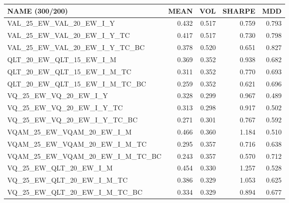 \begin{tabular}{lrrrr}
\toprule
NAME (300/200) & MEAN & VOL & SHARPE & MDD \\
\midrule
VAL\_25\_EW\_VAL\_20\_EW\_I\_Y & 0.432 & 0.517 & 0.759 & 0.793 \\
VAL\_25\_EW\_VAL\_20\_EW\_I\_Y\_TC & 0.417 & 0.517 & 0.730 & 0.798 \\
VAL\_25\_EW\_VAL\_20\_EW\_I\_Y\_TC\_BC & 0.378 & 0.520 & 0.651 & 0.827 \\
QLT\_20\_EW\_QLT\_15\_EW\_I\_M & 0.369 & 0.352 & 0.938 & 0.682 \\
QLT\_20\_EW\_QLT\_15\_EW\_I\_M\_TC & 0.311 & 0.352 & 0.770 & 0.693 \\
QLT\_20\_EW\_QLT\_15\_EW\_I\_M\_TC\_BC & 0.259 & 0.352 & 0.621 & 0.696 \\
VQ\_25\_EW\_VQ\_20\_EW\_I\_Y & 0.328 & 0.299 & 0.967 & 0.489 \\
VQ\_25\_EW\_VQ\_20\_EW\_I\_Y\_TC & 0.313 & 0.298 & 0.917 & 0.502 \\
VQ\_25\_EW\_VQ\_20\_EW\_I\_Y\_TC\_BC & 0.271 & 0.301 & 0.767 & 0.592 \\
VQAM\_25\_EW\_VQAM\_20\_EW\_I\_M & 0.466 & 0.360 & 1.184 & 0.510 \\
VQAM\_25\_EW\_VQAM\_20\_EW\_I\_M\_TC & 0.295 & 0.357 & 0.716 & 0.638 \\
VQAM\_25\_EW\_VQAM\_20\_EW\_I\_M\_TC\_BC & 0.243 & 0.357 & 0.570 & 0.712 \\
VQ\_25\_EW\_QLT\_20\_EW\_I\_M & 0.454 & 0.330 & 1.257 & 0.528 \\
VQ\_25\_EW\_QLT\_20\_EW\_I\_M\_TC & 0.386 & 0.329 & 1.053 & 0.625 \\
VQ\_25\_EW\_QLT\_20\_EW\_I\_M\_TC\_BC & 0.334 & 0.329 & 0.894 & 0.677 \\
\bottomrule
\end{tabular}
